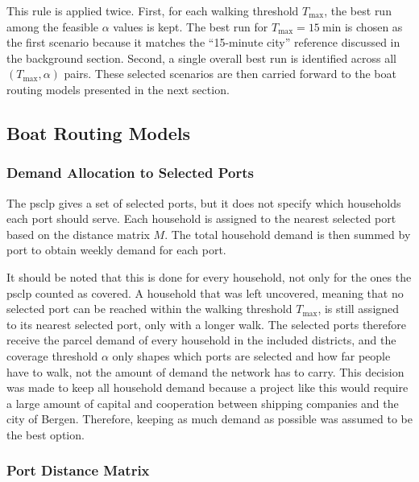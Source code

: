 \documentclass[12pt]{article}
\begin{document}
This rule is applied twice. First, for each walking threshold \(T_{\max}\), the best run among the feasible \(\alpha\) values is kept. The best run for \(T_{\max} = \qty{15}{\minute}\) is chosen as the first scenario because it matches the ``15-minute city'' reference discussed in the background section. Second, a single overall best run is identified across all \((T_{\max}, \alpha)\) pairs. These selected scenarios are then carried forward to the boat routing models presented in the next section.

\subsection{Boat Routing Models}
\label{subsec:boat-routing-models}

\subsubsection{Demand Allocation to Selected Ports}
\label{subsubsec:demand-allocation-to-selected-ports}

The \ac{psclp} gives a set of selected ports, but it does not specify which households each port should serve. Each household is assigned to the nearest selected port based on the distance matrix \(M\). The total household demand is then summed by port to obtain weekly demand for each port.

It should be noted that this is done for every household, not only for the ones the \ac{psclp} counted as covered. A household that was left uncovered, meaning that no selected port can be reached within the walking threshold \(T_{\max}\), is still assigned to its nearest selected port, only with a longer walk. The selected ports therefore receive the parcel demand of every household in the included districts, and the coverage threshold \(\alpha\) only shapes which ports are selected and how far people have to walk, not the amount of demand the network has to carry. This decision was made to keep all household demand because a project like this would require a large amount of capital and cooperation between shipping companies and the city of Bergen. Therefore, keeping as much demand as possible was assumed to be the best option.

\subsubsection{Port Distance Matrix}
\label{subsubsec:port-distance-matrix}
\end{document}
